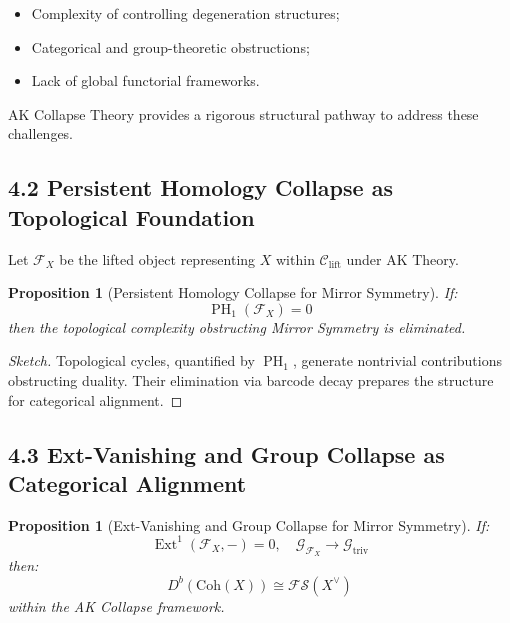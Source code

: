 \documentclass[11pt]{article}
\newtheorem{proposition}[theorem]{Proposition}
\DeclareMathOperator{\Ext}{Ext}
\DeclareMathOperator{\PH}{PH}
\begin{document}
\begin{itemize}
    \item Complexity of controlling degeneration structures;
    \item Categorical and group-theoretic obstructions;
    \item Lack of global functorial frameworks.
\end{itemize}

AK Collapse Theory provides a rigorous structural pathway to address these challenges.

\subsection{4.2 Persistent Homology Collapse as Topological Foundation}

Let $\mathcal{F}_X$ be the lifted object representing $X$ within $\mathcal{C}_{\mathrm{lift}}$ under AK Theory.

\begin{proposition}[Persistent Homology Collapse for Mirror Symmetry]
If:
\begin{equation}
\PH_1(\mathcal{F}_X) = 0
\end{equation}
then the topological complexity obstructing Mirror Symmetry is eliminated.
\end{proposition}

\begin{proof}[Sketch]
Topological cycles, quantified by $\PH_1$, generate nontrivial contributions obstructing duality. Their elimination via barcode decay prepares the structure for categorical alignment.
\end{proof}

\subsection{4.3 Ext-Vanishing and Group Collapse as Categorical Alignment}

\begin{proposition}[Ext-Vanishing and Group Collapse for Mirror Symmetry]
If:
\begin{equation}
\Ext^1(\mathcal{F}_X, -) = 0, \quad \mathcal{G}_{\mathcal{F}_X} \longrightarrow \mathcal{G}_{\mathrm{triv}}
\end{equation}
then:
\begin{equation}
D^b(\mathrm{Coh}(X)) \cong \mathcal{F}\mathcal{S}(X^\vee)
\end{equation}
within the AK Collapse framework.
\end{proposition}
\end{document}
